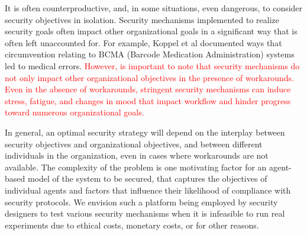 \documentclass{acm_proc_article-sp}
\newcommand{\ignore}[1] {}
\begin{document}

It is often counterproductive, and, in some situations, even
dangerous, to consider security objectives in isolation. Security
mechanisms implemented to realize security goals often impact other
organizational goals in a significant way that is often left unaccounted for. 
For example, Koppel et al \cite{koppel2008workarounds} documented ways
that circumvention relating to BCMA (Barcode Medication
Administration) systems led to medical errors. \textcolor{red}{However, is important to note 
that security mechanisms do not only impact other organizational objectives 
in the presence of workarounds. Even in the absence of workarounds, 
stringent security mechanisms can induce stress, fatigue, and 
changes in mood that impact workflow and hinder progress toward numerous 
organizational goals.}

\ignore{Even in situations where 
workarounds are not employed, medical errors 
may arise due to sincere attempts by clinicians to comply with a system 
that interferes with workflow.}

In general, an optimal security strategy will depend on the interplay
between security objectives and organizational objectives, and between
different individuals in the organization, even in cases where
workarounds are not available. The complexity of the problem is one
motivating factor for an agent-based model of the system to be
secured, that captures the objectives of individual agents and factors
that influence their likelihood of compliance with security
protocols. We envision such a platform being employed by security
designers to test various security mechanisms when it is infeasible to
run real experiments due to ethical costs, monetary costs, or for
other reasons.

\ignore{Suppose we consider the most simple model in which users are incapable of circumvention and fixed timeout thresholds must be used. How do we set the right threshold? In order to even begin approaching this problem we must consider the interplay between security objectives and other organizational objectives. Additionally, we must incorporate the nuances of user behavior-- emotions, biases, etc. To this end, we are in the process of developing an agent-based platform. We envision such a platform being employed by security designers to test various security measures when it is infeasible to run real experiments due to ethical costs, monetary costs, or for other reasons.}
\end{document}

